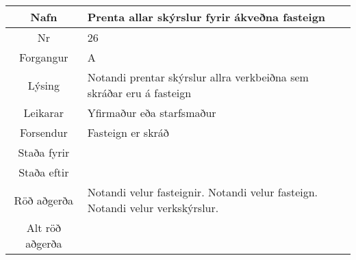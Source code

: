 \documentclass[a4paper]{article}
\begin{document}
\begin{tabular}{|c|p{10cm}|}
\hline
Nafn&Prenta allar skýrslur fyrir ákveðna fasteign\\
\hline
Nr&26\\
\hline
Forgangur&A\\
\hline
Lýsing&Notandi prentar skýrslur allra verkbeiðna sem skráðar eru á fasteign\\
\hline
Leikarar&Yfirmaður eða starfsmaður\\
\hline
Forsendur&Fasteign er skráð\\
\hline
Staða fyrir&\\
\hline
Staða eftir&\\
\hline
Röð aðgerða&Notandi velur fasteignir. Notandi velur fasteign. Notandi velur verkskýrslur.\\
\hline
Alt röð aðgerða&\\
\hline
\end{tabular}
\end{document}
